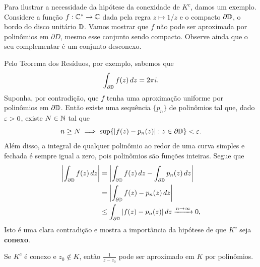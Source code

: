     Para ilustrar a necessidade da hipótese da conexidade de $K^c$, damos um exemplo. 
    Considere a função $f: \mathbb{C}^* \to \mathbb{C}$ dada pela regra $z \mapsto 1/z$ e o compacto 
    $\partial \mathbb{D}$, o bordo do disco unitário  $\mathbb{D}$. Vamos mostrar que $f$ não
    pode ser aproximada por polinômios em $\partial D$, mesmo esse conjunto sendo compacto.
    Observe ainda que o seu complementar é um conjunto desconexo.
    
    Pelo Teorema dos Resíduos, por exemplo, sabemos que
    \begin{equation*}
        \int_{\partial \mathbb{D}}f(z) \, dz = 2 \pi i.
    \end{equation*}
    Suponha, por contradição, que $f$ tenha uma aproximação uniforme por polinômios em 
    $\partial \mathbb{D}$. Então existe uma sequência $\{p_n\}$ de polinômios tal que, 
    dado $\varepsilon > 0$, existe $N \in \mathbb{N}$ tal que
    \begin{equation*}
        n \geq N \implies \sup \{|f(z) - p_n(z)|: z \in \partial \mathbb{D}\} < \varepsilon.
    \end{equation*}
    Além disso, a integral de qualquer polinômio ao redor de uma curva simples e fechada é sempre
    igual a zero, pois polinômios são funções inteiras. Segue que
    \begin{align*}
        \left|\int_{\partial \mathbb{D}} f(z) \, dz\right| 
        &= \left|\int_{\partial \mathbb{D}} f(z) \, dz - \int_{\partial \mathbb{D}} p_n(z) \, dz\right| \\
        &= \left|\int_{\partial \mathbb{D}} f(z) - p_n(z)\, dz\right| \\
        &\leq \int_{\partial \mathbb{D}}|f(z) - p_n(z)| \, dz \xrightarrow{n\to\infty} 0,
    \end{align*}
    Isto é uma clara contradição e mostra a importância da hipótese de que $K^c$ seja {\bf conexo}.
    \begin{lema}
    \label{LR3}
        Se $K^c$ é conexo e $z_0 \not \in K$, então $\displaystyle{\frac{1}{z-z_0}}$ 
        pode ser aproximado em $K$ por polinômios.
    \end{lema}
